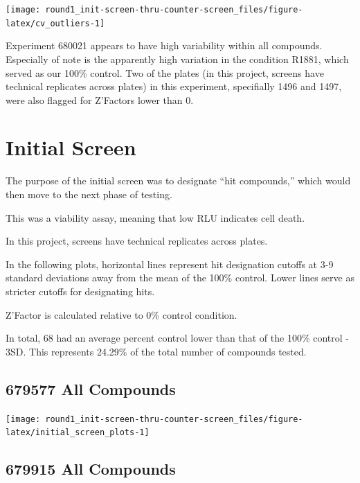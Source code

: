 \documentclass[
]{article}
\begin{document}
\begin{center}\texttt{[image: round1\_init-screen-thru-counter-screen\_files/figure-latex/cv\_outliers-1]} \end{center}

Experiment 680021 appears to have high variability within all compounds.
Especially of note is the apparently high variation in the condition
R1881, which served as our 100\% control. Two of the plates (in this
project, screens have technical replicates across plates) in this
experiment, specifially 1496 and 1497, were also flagged for Z'Factors
lower than 0.

\newpage

\section{Initial Screen}\label{initial-screen}

The purpose of the initial screen was to designate ``hit compounds,''
which would then move to the next phase of testing.

This was a viability assay, meaning that low RLU indicates cell death.

In this project, screens have technical replicates across plates.

In the following plots, horizontal lines represent hit designation
cutoffs at 3-9 standard deviations away from the mean of the 100\%
control. Lower lines serve as stricter cutoffs for designating hits.

Z'Factor is calculated relative to 0\% control condition.

In total, 68 had an average percent control lower than that of the 100\%
control - 3SD. This represents 24.29\% of the total number of compounds
tested.

\subsection{679577 All Compounds}\label{all-compounds}

\begin{center}\texttt{[image: round1\_init-screen-thru-counter-screen\_files/figure-latex/initial\_screen\_plots-1]} \end{center}

\newpage

\subsection{679915 All Compounds}\label{all-compounds-1}
\end{document}
